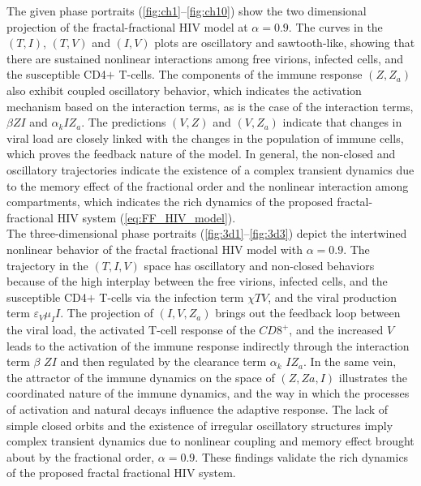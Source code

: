 \documentclass{article}
\theoremstyle{plain}
\theoremstyle{definition}
\numberwithin{equation}{section}
\begin{document}
The given phase portraits (\ref{fig:ch1}--\ref{fig:ch10}) show the two dimensional projection of the fractal-fractional HIV model at $\alpha=0.9$. The curves in the $(T,I)$, $(T, V)$ and $(I, V)$ plots are oscillatory and sawtooth-like, showing that there are sustained nonlinear interactions among free virions, infected cells, and the susceptible CD4${+}$ T-cells. The components of the immune response $(Z,Z_a )$ also exhibit coupled oscillatory behavior, which indicates the activation mechanism based on the interaction terms, as is the case of the interaction terms, $\beta ZI$ and $\alpha_k I Z_a$. The predictions $(V,Z)$ and $(V,Z_a)$ indicate that changes in viral load are closely linked with the changes in the population of immune cells, which proves the feedback nature of the model. In general, the non-closed and oscillatory trajectories indicate the existence of a complex transient dynamics due to the memory effect of the fractional order and the nonlinear interaction among compartments, which indicates the rich dynamics of the proposed fractal-fractional HIV system (\ref{eq:FF_HIV_model}).\\
The three-dimensional phase portraits (\ref{fig:3d1}--\ref{fig:3d3}) depict the intertwined nonlinear behavior of the fractal fractional HIV model with $\alpha = 0.9$. The trajectory in the $(T,I,V)$ space has oscillatory and non-closed behaviors because of the high interplay between the free virions, infected cells, and the susceptible CD4${+}$ T-cells via the infection term $\chi T V$, and the viral production term $\varepsilon_V \mu_I I$. 
The projection of $(I,V,Z_a)$ brings out the feedback loop between the viral load, the activated T-cell response of the $CD8^{+}$, and the increased $V$ leads to the activation of the immune response indirectly through the interaction term $\beta$ $ZI$ and then regulated by the clearance term $\alpha_k$ $I Z_a$. 
In the same vein, the attractor of the immune dynamics on the space of $(Z,Za,I)$ illustrates the coordinated nature of the immune dynamics, and the way in which the processes of activation and natural decays influence the adaptive response. The lack of simple closed orbits and the existence of irregular oscillatory structures imply complex transient dynamics due to nonlinear coupling and memory effect brought about by the fractional order, $\alpha = 0.9$. These findings validate the rich dynamics of the proposed fractal  fractional HIV system.
\end{document}
